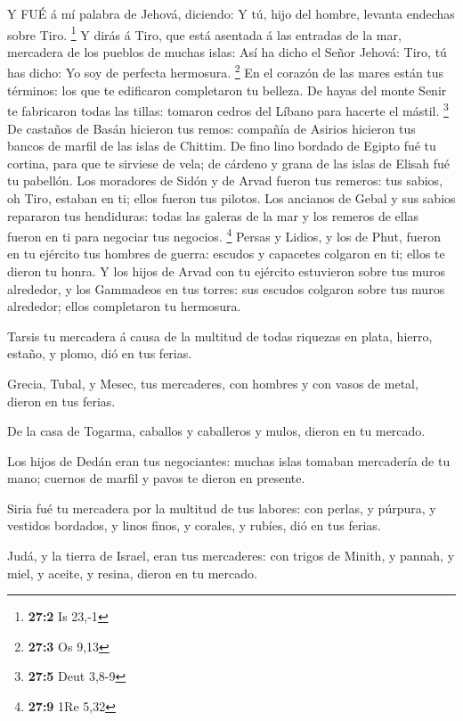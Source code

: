  Y FUÉ á mí palabra de Jehová, diciendo:  Y tú,
hijo del hombre, levanta endechas sobre Tiro. \footnote{\textbf{27:2} Is
  23,-1}  Y dirás á Tiro, que está asentada á las entradas
de la mar, mercadera de los pueblos de muchas islas: Así ha dicho el
Señor Jehová: Tiro, tú has dicho: Yo soy de perfecta hermosura.
\footnote{\textbf{27:3} Os 9,13}  En el corazón de las mares
están tus términos: los que te edificaron completaron tu belleza.
 De hayas del monte Senir te fabricaron todas las tillas:
tomaron cedros del Líbano para hacerte el mástil. \footnote{\textbf{27:5}
  Deut 3,8-9}  De castaños de Basán hicieron tus remos:
compañía de Asirios hicieron tus bancos de marfil de las islas de
Chittim.  De fino lino bordado de Egipto fué tu cortina,
para que te sirviese de vela; de cárdeno y grana de las islas de Elisah
fué tu pabellón.  Los moradores de Sidón y de Arvad fueron
tus remeros: tus sabios, oh Tiro, estaban en ti; ellos fueron tus
pilotos.  Los ancianos de Gebal y sus sabios repararon tus
hendiduras: todas las galeras de la mar y los remeros de ellas fueron en
ti para negociar tus negocios. \footnote{\textbf{27:9} 1Re 5,32}
 Persas y Lidios, y los de Phut, fueron en tu ejército tus
hombres de guerra: escudos y capacetes colgaron en ti; ellos te dieron
tu honra.  Y los hijos de Arvad con tu ejército estuvieron
sobre tus muros alrededor, y los Gammadeos en tus torres: sus escudos
colgaron sobre tus muros alrededor; ellos completaron tu hermosura.

 Tarsis tu mercadera á causa de la multitud de todas
riquezas en plata, hierro, estaño, y plomo, dió en tus ferias.

 Grecia, Tubal, y Mesec, tus mercaderes, con hombres y con
vasos de metal, dieron en tus ferias.

 De la casa de Togarma, caballos y caballeros y mulos,
dieron en tu mercado.

 Los hijos de Dedán eran tus negociantes: muchas islas
tomaban mercadería de tu mano; cuernos de marfil y pavos te dieron en
presente.

 Siria fué tu mercadera por la multitud de tus labores: con
perlas, y púrpura, y vestidos bordados, y linos finos, y corales, y
rubíes, dió en tus ferias.

 Judá, y la tierra de Israel, eran tus mercaderes: con
trigos de Minith, y pannah, y miel, y aceite, y resina, dieron en tu
mercado.

